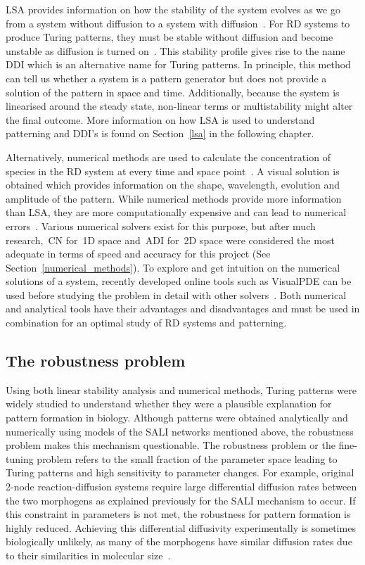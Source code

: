 LSA provides information on how the stability of the system evolves as we go from a system without diffusion to a system with diffusion~\parencite{Glendinning1994}.
For RD systems to produce Turing patterns, they must be stable without diffusion and become unstable as diffusion is turned on~\parencite{J.DMurray2002}.
This stability profile gives rise to the name \acrfull{DDI} which is an alternative name for Turing patterns.
In principle, this method can tell us whether a system is a pattern generator but does not provide a solution of the pattern in space and time. Additionally, because the system is linearised around the steady state, non-linear terms or multistability might alter the final outcome.
More information on how LSA is used to understand patterning and DDI's is found on Section~\ref{lsa} in the following chapter.

Alternatively, numerical methods are used to calculate the concentration of species in the RD system at every time and space point~\parencite{Ramos1983}.
A visual solution is obtained which provides information on the shape, wavelength, evolution and amplitude of the pattern.
While numerical methods provide more information than LSA, they are more computationally expensive and can lead to numerical errors~\parencite{J.DMurray2002}.
Various numerical solvers exist for this purpose, but after much research,~\acrfull{CN} for~\acrshort{1D} space and~\acrfull{ADI} for~\acrshort{2D} space were considered the most adequate in terms of speed and accuracy for this project (See Section~\ref{numerical_methods}).
To explore and get intuition on the numerical solutions of a system, recently developed online tools such as VisualPDE can be used before studying the problem in detail with other solvers~\parencite{Walker2023}.
Both numerical and analytical tools have their advantages and disadvantages and must be used in combination for an optimal study of RD systems and patterning.

\subsection{The robustness problem}

Using both linear stability analysis and numerical methods, Turing patterns were widely studied to understand whether they were a plausible explanation for pattern formation in biology.
Although patterns were obtained analytically and numerically using models of the SALI networks mentioned above, the robustness problem makes this mechanism questionable.
The robustness problem or the fine-tuning problem refers to the small fraction of the parameter space leading to Turing patterns and high sensitivity to parameter changes.
For example, original 2-node reaction-diffusion systems require large differential diffusion rates between the two morphogens as explained previously for the SALI mechanism to occur.
If this constraint in parameters is not met, the robustness for pattern formation is highly reduced.
Achieving this differential diffusivity experimentally is sometimes biologically unlikely, as many of the morphogens have similar diffusion rates due to their similarities in molecular size~\parencite{huidobro}.

